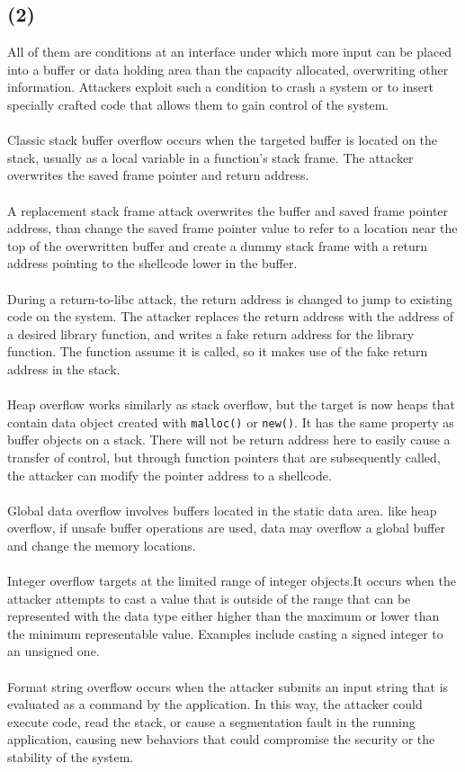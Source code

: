 \documentclass[a4paper]{article}
\begin{document}
\subsection*{(2)}
All of them are conditions at an interface under which more input can be placed into a buffer or data holding area than the capacity allocated, overwriting other information. Attackers exploit such a condition to crash a system or to insert specially crafted code that allows them to gain control of the system.\\\\
Classic stack buffer overflow occurs when the targeted buffer is located on the stack, usually as a local variable in a function's stack frame. The attacker overwrites the saved frame pointer and return address.\\\\
A replacement stack frame attack overwrites the buffer and saved frame pointer address, than change the saved frame pointer value to refer to a location near the top of the overwritten buffer and create a dummy stack frame with a return address pointing to the shellcode lower in the buffer.\\\\
During a return-to-libc attack, the return address is changed to jump to existing code on the system. The attacker replaces the return address with the address of a desired library function, and writes a fake return address for the library function. The function assume it is called, so it makes use of the fake return address in the stack.\\\\
Heap overflow works similarly as stack overflow, but the target is now heaps that contain data object created with \verb+malloc()+ or \verb+new()+. It has the same property as buffer objects on a stack. There will not be return address here to easily cause a transfer of control, but through function pointers that are subsequently called, the attacker can modify the pointer address to a shellcode.\\\\
Global data overflow involves buffers located in the static data area. like heap overflow, if unsafe buffer operations are used, data may overflow a global buffer and change the memory locations.\\\\
Integer overflow targets at the limited range of integer objects.It occurs when the attacker attempts to cast a value that is outside of the range that can be represented with the data type either higher than the maximum or lower than the minimum representable value. Examples include casting a signed integer to an unsigned one.\\\\
Format string overflow occurs when the attacker submits an input string that is evaluated as a command by the application. In this way, the attacker could execute code, read the stack, or cause a segmentation fault in the running application, causing new behaviors that could compromise the security or the stability of the system.
\end{document}
